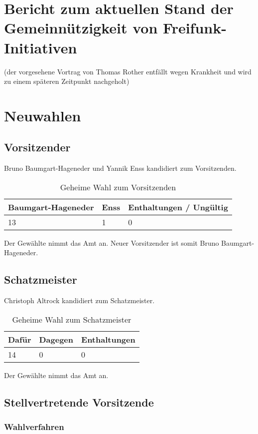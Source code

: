 \documentclass[a4paper]{scrartcl}
\begin{document}
\section{Bericht zum aktuellen Stand der Gemeinnützigkeit von Freifunk-Initiativen}

(der vorgesehene Vortrag von Thomas Rother entfällt wegen Krankheit und wird zu einem späteren Zeitpunkt nachgeholt)

\clearpage
\section{Neuwahlen}
\subsection{Vorsitzender}
Bruno Baumgart-Hageneder und Yannik Enss kandidiert zum Vorsitzenden.
\begin{table}[H]
\begin{tabularx}{\textwidth}{XXX}
Baumgart-Hageneder & Enss & Enthaltungen / Ungültig\\
\toprule
13 & 1 & 0\\
\end{tabularx}
\caption{Geheime Wahl zum Vorsitzenden}
\end{table}
Der Gewählte nimmt das Amt an. Neuer Vorsitzender ist somit Bruno Baumgart-Hageneder.

\subsection{Schatzmeister}
Christoph Altrock kandidiert zum Schatzmeister.
\begin{table}[H]
\begin{tabularx}{\textwidth}{XXX}
Dafür & Dagegen & Enthaltungen\\
\toprule
14 & 0 & 0 \\
\end{tabularx}
\caption{Geheime Wahl zum Schatzmeister}
\end{table}
Der Gewählte nimmt das Amt an.

\subsection{Stellvertretende Vorsitzende}
\subsubsection{Wahlverfahren}
\end{document}
